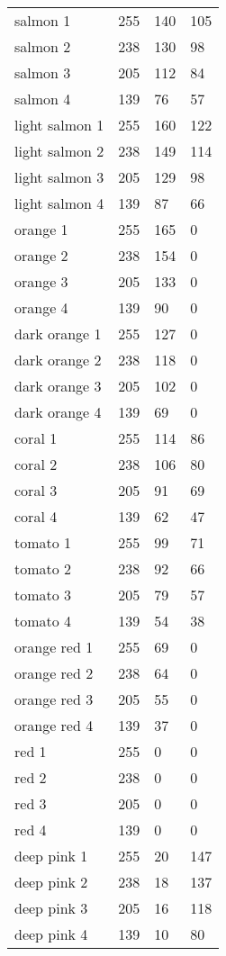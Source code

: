 \begin{center}
\begin{tabular}{llll}
  salmon 1 & 255 & 140 & 105  \\
  salmon 2 & 238 & 130 & 98  \\
  salmon 3 & 205 & 112 & 84  \\
  salmon 4 & 139 & 76 & 57  \\
  light salmon 1 & 255 & 160 & 122  \\
  light salmon 2 & 238 & 149 & 114  \\
  light salmon 3 & 205 & 129 & 98  \\
  light salmon 4 & 139 & 87 & 66  \\
  orange 1 & 255 & 165 & 0  \\
  orange 2 & 238 & 154 & 0  \\
  orange 3 & 205 & 133 & 0  \\
  orange 4 & 139 & 90 & 0  \\
  dark orange 1 & 255 & 127 & 0  \\
  dark orange 2 & 238 & 118 & 0  \\
  dark orange 3 & 205 & 102 & 0  \\
  dark orange 4 & 139 & 69 & 0  \\
  coral 1 & 255 & 114 & 86  \\
  coral 2 & 238 & 106 & 80  \\
  coral 3 & 205 & 91 & 69  \\
  coral 4 & 139 & 62 & 47  \\
  tomato 1 & 255 & 99 & 71  \\
  tomato 2 & 238 & 92 & 66  \\
  tomato 3 & 205 & 79 & 57  \\
  tomato 4 & 139 & 54 & 38  \\
  orange red 1 & 255 & 69 & 0  \\
  orange red 2 & 238 & 64 & 0  \\
  orange red 3 & 205 & 55 & 0  \\
  orange red 4 & 139 & 37 & 0  \\
  red 1 & 255 & 0 & 0  \\
  red 2 & 238 & 0 & 0  \\
  red 3 & 205 & 0 & 0  \\
  red 4 & 139 & 0 & 0  \\
  deep pink 1 & 255 & 20 & 147  \\
  deep pink 2 & 238 & 18 & 137  \\
  deep pink 3 & 205 & 16 & 118  \\
  deep pink 4 & 139 & 10 & 80  \\

\end{tabular}
\end{center}

